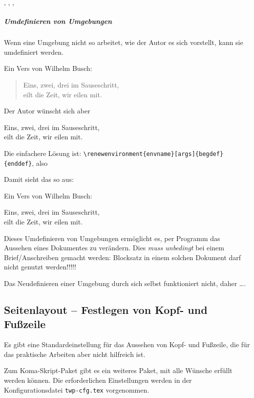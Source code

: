 

, , , 


\subparagraph{Umdefinieren von Umgebungen}

Wenn eine Umgebung nicht so arbeitet, wie der Autor es sich vorstellt, 
kann sie umdefiniert werden.

Ein Vers von Wilhelm Busch:
\begin{verse}
  Eins, zwei, drei im Sauseschritt, \\
  eilt die Zeit, wir eilen mit.
\end{verse}

Der Autor wünscht sich aber
\begin{center}
  Eins, zwei, drei im Sauseschritt, \\
  eilt die Zeit, wir eilen mit.
\end{center}

Die einfachere Lösung ist:
\lstinline|\renewenvironment{envname}[args]{begdef}{enddef}|, also
\renewenvironment{verse}{\begin{center}}{\end{center}}

Damit sieht das so aus:

Ein Vers von Wilhelm Busch:
\begin{verse}
  Eins, zwei, drei im Sauseschritt, \\
  eilt die Zeit, wir eilen mit.
\end{verse}

Dieses Umdefinieren von Umgebungen ermöglicht es, per Programm das Aussehen
eines Dokumentes zu verändern. Dies \emph{muss unbedingt} bei einem
Brief/Anschreiben gemacht werden: Blocksatz in einem solchen Dokument darf
nicht genutzt werden!!!!!

Das Neudefinieren einer Umgebung durch sich selbst funktioniert nicht, daher
\ldots.


\subsection{Seitenlayout -- Festlegen von Kopf- und Fußzeile}

Es gibt eine Standardeinstellung für das Aussehen von  Kopf- und Fußzeile,
die für das praktische Arbeiten aber nicht hilfreich ist.

Zum Koma-Skript-Paket gibt es ein weiteres Paket, mit alle Wünsche erfüllt
werden können. Die erforderlichen Einstellungen werden in der
Konfigurationsdatei \texttt{twp-cfg.tex} vorgenommen.


